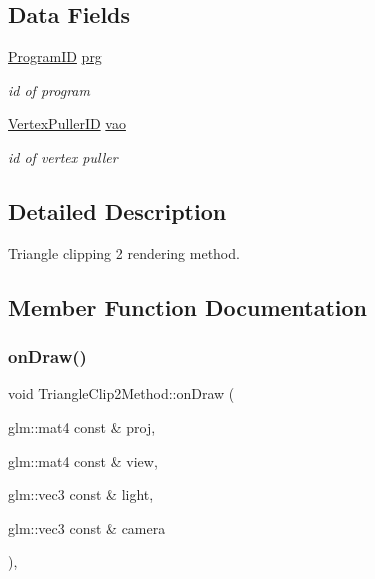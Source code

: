 \subsection*{Data Fields}
\begin{DoxyCompactItemize}
\item 
\mbox{\label{classTriangleClip2Method_a88f7bc73ef771bef04bf03194764ca26}} 
\hyperlink{fwd_8hpp_a46ffd067c21ab50f5f1fcfed5d8bfc15}{Program\+ID} \hyperlink{classTriangleClip2Method_a88f7bc73ef771bef04bf03194764ca26}{prg}
\begin{DoxyCompactList}\small\item\em id of program \end{DoxyCompactList}\item 
\mbox{\label{classTriangleClip2Method_a006049aeb1b86f7f94504b0d7b13f4a9}} 
\hyperlink{fwd_8hpp_af6f78f73099477c9ce5537d657597486}{Vertex\+Puller\+ID} \hyperlink{classTriangleClip2Method_a006049aeb1b86f7f94504b0d7b13f4a9}{vao}
\begin{DoxyCompactList}\small\item\em id of vertex puller \end{DoxyCompactList}\end{DoxyCompactItemize}


\subsection{Detailed Description}
Triangle clipping 2 rendering method. 

\subsection{Member Function Documentation}
\mbox{\label{classTriangleClip2Method_a8433b228a45401ae637ec6d65a047ea5}} 
\subsubsection{\texorpdfstring{on\+Draw()}{onDraw()}}
{\footnotesize\ttfamily void Triangle\+Clip2\+Method\+::on\+Draw (\begin{DoxyParamCaption}\item[{glm\+::mat4 const \&}]{proj,  }\item[{glm\+::mat4 const \&}]{view,  }\item[{glm\+::vec3 const \&}]{light,  }\item[{glm\+::vec3 const \&}]{camera }\end{DoxyParamCaption})\hspace{0.3cm}{\ttfamily [override]}, {\ttfamily [virtual]}}



